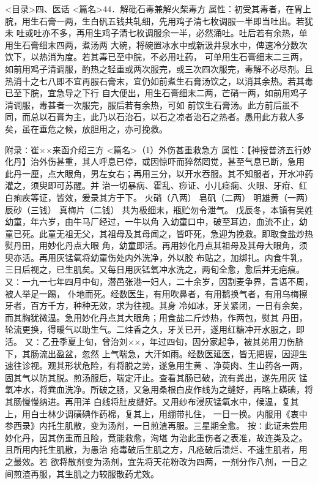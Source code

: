 \documentclass[a4paper,12pt,UTF8,twoside]{ctexbook}
\begin{document}
<目录>四、医话
<篇名>44．解砒石毒兼解火柴毒方
属性：初受其毒者，在胃上脘，用生石膏一两，生白矾五钱共轧细，先用鸡子清七枚调服一半即当吐出。若犹未 
吐或吐亦不多，再用生鸡子清七枚调服余一半，必然涌吐。吐后若有余热，单用生石膏细末四两，煮汤两 
大碗，将碗置冰水中或新汲井泉水中，俾速冷分数次饮下，以热消为度。若其毒已至中脘，不必用吐药， 
可单用生石膏细末二三两，如前用鸡子清调服，酌热之轻重或两次服完，或三次四次服完，毒解不必尽剂。且 
热消十之七八即不宜再服石膏末，宜仍如前煮生石膏汤饮之，以消其余热。若其毒已至下脘，宜急导之下行 
自大便出，用生石膏细末二两，芒硝一两，如前用鸡子清调服，毒甚者一次服完，服后若有余热，可如 
前饮生石膏汤。此方前后虽不同，而总以石膏为主，此乃以石治石，以石之凉者治石之热者。愚用此方救人多 
矣，虽在垂危之候，放胆用之，亦可挽救。 

附录∶崔××来函介绍三方
<篇名>（1）外伤甚重救急方
属性：【神授普济五行妙化丹】治外伤甚重，其人呼息已停，或因惊吓而猝然罔觉，甚至气息已断，急用 
此丹一厘，点大眼角，男左女右；再用三分，以开水吞服。其不知服者，开水冲药灌之，须臾即可苏醒。并 
治一切暴病、霍乱、痧证、小儿痉痫、火眼、牙疳、红白痢疾等证，皆效，爰录其方于下。 
火硝（八两） 皂矾（二两） 明雄黄（一两） 辰砂（三钱） 真梅片（二钱） 
共为极细末，瓶贮勿令泄气。 
戊辰冬，本镇有吴姓幼童，年六岁，由牛马厂经过，一牛以角 入幼童口中，破至耳边，血流不止，幼 
童已死。此童无祖无父，其祖母及其母闻之，皆吓死，急迎为挽救。即取食盐炒热熨丹田，用妙化丹点大眼 
角，幼童即活。再用妙化丹点其祖母及其母大眼角，须臾亦活。再用灰锰氧将幼童伤处内外洗净，外以胶 
布贴之，加绑扎。内食牛乳，三日后视之，已生肌矣。又每日用灰锰氧冲水洗之，两旬全愈，愈后并无疤痕。 
又∶一九一七年四月中旬，潜邑张港一妇人，二十余岁，因割麦争界，言语不周，被人举足一踢， 
仆地而死。经数医生，有用吹鼻者，有用鹅换气者，有用乌梅擦牙者，百方千方，种种无效，求为往视。其身 
冷如冰，牙关紧闭，一日有余矣，而其胸犹微温。急用妙化丹点其大眼角；用食盐二斤炒热，作两包，熨其 
丹田，轮流更换，得暖气以助生气。二炷香之久，牙关已开，遂用红糖冲开水服之，即活。 
又∶乙丑季夏上旬，曾治刘××，年过四旬，因分家起争，被其弟用刀伤脐下，其肠流出盈盆，忽然 
上气喘急，大汗如雨。经数医延医，皆无把握，因迎生速往诊视。观其形状危险，有将脱之势，遂急用生黄 
、净萸肉、生山药各一两，固其气以防其脱。煎汤服后，喘定汗止。查看其肠已破，流有粪出，遂先用灰 
锰氧冲水，将粪血洗净。所破之肠，又急用桑根白皮作线为之缝好，再略上磺碘，将其肠慢慢纳进。再用洋 
白线将肚皮缝好。又用纱布浸灰锰氧水中，候温，复其上，用白士林少调磺碘作药棉，复其上，用绷带扎住， 
一日一换。内服用《衷中参西录》内托生肌散，变为汤剂，一日煎渣再服。三星期全愈。 
按∶此证未尝用妙化丹，因其伤重而且险，竟能救愈，洵堪 
为治此重伤者之表准，故连类及之。且所用内托生肌散，为愚治 
疮毒破后生肌之方，凡疮破后溃烂、不速生肌者，用之最效。若 
欲将散剂变为汤剂，宜先将天花粉改为四两，一剂分作八剂，一日之间煎渣再服，其生肌之力较服散药尤效。 
\end{document}
